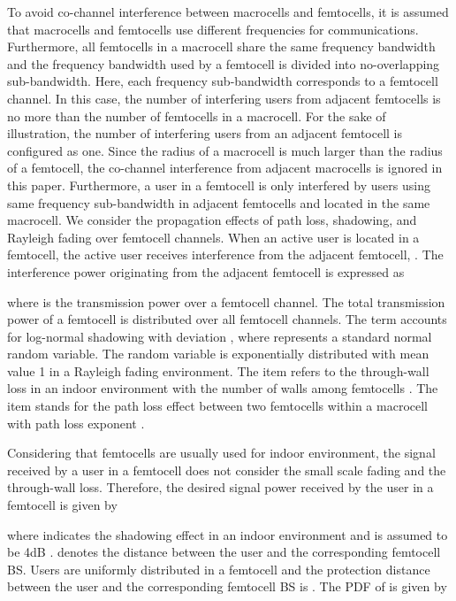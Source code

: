 \documentclass[10pt,final,journal,letterpaper,twoside,twocolumn]{IEEEtran}
\begin{document}
To avoid co-channel interference between macrocells and femtocells, it is assumed that macrocells and femtocells use different frequencies for communications. Furthermore, all femtocells in a macrocell share the same frequency bandwidth and the frequency bandwidth used by a femtocell is divided into 
no-overlapping sub-bandwidth. Here, each frequency sub-bandwidth corresponds to a femtocell
channel. In this case, the number of interfering users from adjacent
femtocells is no more than the number of femtocells in a macrocell. For the sake of illustration,
the number of interfering users from an adjacent femtocell is configured as one. Since the
radius of a macrocell is much larger than the radius of a femtocell, the
co-channel interference from adjacent macrocells is ignored in this paper.
Furthermore, a user in a femtocell is only interfered by users using same
frequency sub-bandwidth in adjacent femtocells and located in the same macrocell. We consider
the propagation effects of path loss, shadowing, and Rayleigh fading over femtocell channels.
When an active user is located in a femtocell, the active user receives interference from the  adjacent femtocell, .
The interference power originating from the  adjacent femtocell is expressed as \cite{802.16m,Cheng12,Ge11}

where  is the transmission power over a femtocell channel. The total
transmission power of a femtocell is distributed over all femtocell channels.
The term  accounts for log-normal shadowing with deviation
, where  represents a standard
normal random variable. The random variable  is exponentially distributed
with mean value 1 in a Rayleigh fading environment. The item  refers
to the through-wall loss in an indoor environment with the number of walls
among femtocells . The item  stands for the path loss
effect between two femtocells within a macrocell with path loss exponent
.

Considering that femtocells are usually used for indoor environment, the signal received by a user in a femtocell does not consider the small
scale fading and the through-wall loss. Therefore, the desired signal power 
received by the  user in a femtocell is given by

where  indicates the shadowing effect in an indoor
environment and is assumed to be 4dB \cite{femtoforum}.  denotes the distance between
the user  and the corresponding femtocell BS. Users are uniformly distributed in a
femtocell and the protection distance between the user and the corresponding femtocell BS
is . The PDF of  is given by
\end{document}

